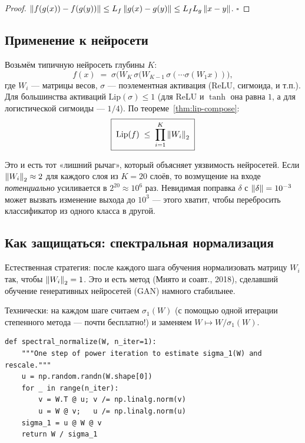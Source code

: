 \begin{proof}
$\left\|f(g(x))-f(g(y))\right\|\leq L_f\left\|g(x)-g(y)\right\|\leq L_f L_g\left\|x-y\right\|$. $\square$
\end{proof}

\subsection{Применение к нейросети}

Возьмём типичную нейросеть глубины $K$:
\[
f(x)\;=\;\sigma\bigl(W_K\,\sigma(W_{K-1}\,\sigma(\cdots\sigma(W_1 x))\bigr),
\]
где $W_i$ — матрицы весов, $\sigma$ — поэлементная активация (ReLU,
сигмоида, и т.п.). Для большинства активаций $\mathrm{Lip}(\sigma)\leq 1$
(для ReLU и $\tanh$ она равна $1$, а для логистической сигмоиды — $1/4$). По
теореме~\ref{thm:lip-compose}:
\begin{equation}\label{eq:nn-lip}
\boxed{\;\mathrm{Lip}(f)\;\leq\;\prod_{i=1}^{K}\left\|W_i\right\|_2\;}
\end{equation}

Это и есть тот «лишний рычаг», который объясняет уязвимость
нейросетей. Если $\left\|W_i\right\|_2 \approx 2$ для каждого слоя из $K=20$
слоёв, то возмущение на входе \emph{потенциально} усиливается
в $2^{20}\approx 10^{6}$ раз. Невидимая поправка $\delta$ с
$\left\|\delta\right\|=10^{-3}$ может вызвать изменение выхода до $10^{3}$ —
этого хватит, чтобы перебросить классификатор из одного класса в другой.

\subsection{Как защищаться: спектральная нормализация}

Естественная стратегия: после каждого шага обучения нормализовать
матрицу $W_i$ так, чтобы $\left\|W_i\right\|_2 = 1$. Это и есть метод
 (Миято и соавт., 2018), сделавший
обучение генеративных нейросетей (GAN) намного стабильнее.

Технически: на каждом шаге считаем $\sigma_1(W)$ (с помощью одной
итерации степенного метода — почти бесплатно!) и заменяем
$W \mapsto W/\sigma_1(W)$.

\begin{lstlisting}[label={lst:spec-norm}]
def spectral_normalize(W, n_iter=1):
    """One step of power iteration to estimate sigma_1(W) and rescale."""
    u = np.random.randn(W.shape[0])
    for _ in range(n_iter):
        v = W.T @ u; v /= np.linalg.norm(v)
        u = W @ v;   u /= np.linalg.norm(u)
    sigma_1 = u @ W @ v
    return W / sigma_1
\end{lstlisting}

